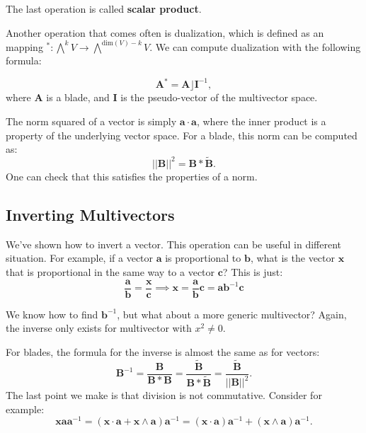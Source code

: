 The last operation is called \textbf{scalar product}.

Another operation that comes often is dualization, which is defined
as an mapping  $^*: \bigwedge^k V \to \bigwedge^{\text{dim}(V) - k}V$.
We can compute dualization with the following formula:

\begin{displaymath}
    \mathbf A^* = \mathbf A \rfloor \mathbf I^{-1},
\end{displaymath}
where $\mathbf A$ is a blade, and $\mathbf I$ is the pseudo-vector of the multivector space.

The norm squared of a vector is simply $\mathbf a \cdot \mathbf a$, where the inner product is a property of the underlying vector space.
For a blade, this norm can be computed as:
$$
\mathbf ||\mathbf B||^2 = \mathbf B * \tilde{\mathbf B}.
$$
One can check that this satisfies the properties of a norm.

\subsection{Inverting Multivectors}

We've shown how to invert a vector. This operation can be useful in different situation. For example, if
a vector $\mathbf a$ is proportional to $\mathbf b$, what is the vector $\mathbf x$ that is proportional
in the same way to a vector $\mathbf c$? This is just:
\begin{displaymath}
    \frac{\mathbf a}{\mathbf b} =
    \frac{\mathbf x}{\mathbf c} \implies
    \mathbf x = \frac{\mathbf a}{\mathbf b} \mathbf c =  \mathbf a \mathbf b^{-1} \mathbf c 
\end{displaymath}

We know how to find $\mathbf b^{-1}$, but what about a more generic multivector? Again, the inverse
only exists for multivector with $x^2 \neq 0$.

For blades, the formula for the inverse is almost the same as for vectors:
\begin{displaymath}
    \mathbf B^{-1} = \frac{\mathbf B}{\mathbf B * \mathbf B} = 
    \frac{\tilde{\mathbf B}}{\mathbf B * \tilde{\mathbf B}} = 
    \frac{\tilde{\mathbf B}}{||\mathbf B ||^2}.
\end{displaymath}
The last point we make is that division is not commutative. Consider for example:
\begin{displaymath}
    \mathbf x \mathbf a \mathbf a^{-1}
    = (\mathbf x \cdot \mathbf a + \mathbf x \wedge \mathbf a) \mathbf a^{-1}
    = (\mathbf x \cdot \mathbf a) \mathbf a^{-1} + (\mathbf x \wedge \mathbf a) \mathbf a^{-1}.
\end{displaymath}

